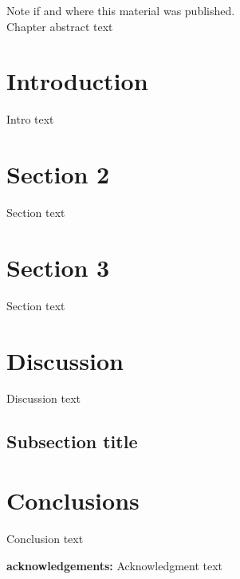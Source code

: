 \label{ch1}

\noindent Note if and where this material was published. \\

Chapter abstract text

\section{Introduction}

Intro text \citep{Dawson:2012dl}

\section{Section 2}

Section text

\section{Section 3}

Section text

\section{Discussion}

Discussion text

\subsection{Subsection title}

\section{Conclusions}

Conclusion text

\textbf{acknowledgements:}
Acknowledgment text

%
{}



%
%  
